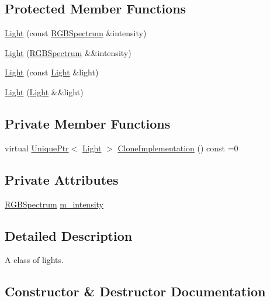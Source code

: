 \subsection*{Protected Member Functions}
\begin{DoxyCompactItemize}
\item 
\hyperlink{classmage_1_1_light_ab470ad4bde2c1e27068541bb53accb0c}{Light} (const \hyperlink{structmage_1_1_r_g_b_spectrum}{R\+G\+B\+Spectrum} \&intensity)
\item 
\hyperlink{classmage_1_1_light_aae4b7899b7709f658d0d061909e45cec}{Light} (\hyperlink{structmage_1_1_r_g_b_spectrum}{R\+G\+B\+Spectrum} \&\&intensity)
\item 
\hyperlink{classmage_1_1_light_aa91ba3fde50487939d99252c73f732cc}{Light} (const \hyperlink{classmage_1_1_light}{Light} \&light)
\item 
\hyperlink{classmage_1_1_light_a75343c11264fa27c4f166caaf0fec880}{Light} (\hyperlink{classmage_1_1_light}{Light} \&\&light)
\end{DoxyCompactItemize}
\subsection*{Private Member Functions}
\begin{DoxyCompactItemize}
\item 
virtual \hyperlink{namespacemage_a8c307fbcc33bce9b7f2aa4c26c3b95cf}{Unique\+Ptr}$<$ \hyperlink{classmage_1_1_light}{Light} $>$ \hyperlink{classmage_1_1_light_aa613d76a1ebda69efde853d15f75490c}{Clone\+Implementation} () const =0
\end{DoxyCompactItemize}
\subsection*{Private Attributes}
\begin{DoxyCompactItemize}
\item 
\hyperlink{structmage_1_1_r_g_b_spectrum}{R\+G\+B\+Spectrum} \hyperlink{classmage_1_1_light_a4ed8d43c8a4df71671a922d5f04974b8}{m\+\_\+intensity}
\end{DoxyCompactItemize}


\subsection{Detailed Description}
A class of lights. 

\subsection{Constructor \& Destructor Documentation}
\hypertarget{classmage_1_1_light_af877bc473dede83689a4bda8a36d4d36}{}\label{classmage_1_1_light_af877bc473dede83689a4bda8a36d4d36} 
